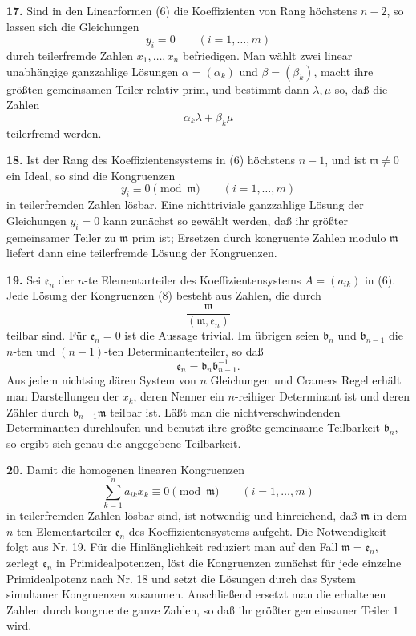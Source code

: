 \documentclass[11pt,a4paper]{article}
\begin{document}
\textbf{17.} Sind in den Linearformen (6) die Koeffizienten von Rang höchstens \(n-2\), so lassen sich die Gleichungen
\[
 y_i=0\qquad(i=1,\ldots,m)
\]
durch teilerfremde Zahlen \(x_1,\ldots,x_n\) befriedigen. Man wählt zwei linear unabhängige ganzzahlige Lösungen \(\alpha=(\alpha_k)\) und \(\beta=(\beta_k)\), macht ihre größten gemeinsamen Teiler relativ prim, und bestimmt dann \(\lambda,\mu\) so, daß die Zahlen
\[
 \alpha_k\lambda+\beta_k\mu
\]
teilerfremd werden.

\textbf{18.} Ist der Rang des Koeffizientensystems in (6) höchstens \(n-1\), und ist \(\mathfrak m\ne0\) ein Ideal, so sind die Kongruenzen
\[
 y_i\equiv0\pmod{\mathfrak m}\qquad(i=1,\ldots,m) \tag{8}
\]
in teilerfremden Zahlen lösbar. Eine nichttriviale ganzzahlige Lösung der Gleichungen \(y_i=0\) kann zunächst so gewählt werden, daß ihr größter gemeinsamer Teiler zu \(\mathfrak m\) prim ist; Ersetzen durch kongruente Zahlen modulo \(\mathfrak m\) liefert dann eine teilerfremde Lösung der Kongruenzen.

\textbf{19.} Sei \(\mathfrak e_n\) der \(n\)-te Elementarteiler des Koeffizientensystems \(A=(a_{ik})\) in (6). Jede Lösung der Kongruenzen (8) besteht aus Zahlen, die durch
\[
 \frac{\mathfrak m}{(\mathfrak m,\mathfrak e_n)}
\]
teilbar sind. Für \(\mathfrak e_n=0\) ist die Aussage trivial. Im übrigen seien \(\mathfrak b_n\) und \(\mathfrak b_{n-1}\) die \(n\)-ten und \((n-1)\)-ten Determinantenteiler, so daß
\[
 \mathfrak e_n=\mathfrak b_n\mathfrak b_{n-1}^{-1}.
\]
Aus jedem nichtsingulären System von \(n\) Gleichungen und Cramers Regel erhält man Darstellungen der \(x_k\), deren Nenner ein \(n\)-reihiger Determinant ist und deren Zähler durch \(\mathfrak b_{n-1}\mathfrak m\) teilbar ist. Läßt man die nichtverschwindenden Determinanten durchlaufen und benutzt ihre größte gemeinsame Teilbarkeit \(\mathfrak b_n\), so ergibt sich genau die angegebene Teilbarkeit.

\textbf{20.} Damit die homogenen linearen Kongruenzen
\[
 \sum_{k=1}^{n}a_{ik}x_k\equiv0\pmod{\mathfrak m}\qquad(i=1,\ldots,m) \tag{9}
\]
in teilerfremden Zahlen lösbar sind, ist notwendig und hinreichend, daß \(\mathfrak m\) in dem \(n\)-ten Elementarteiler \(\mathfrak e_n\) des Koeffizientensystems aufgeht. Die Notwendigkeit folgt aus Nr. 19. Für die Hinlänglichkeit reduziert man auf den Fall \(\mathfrak m=\mathfrak e_n\), zerlegt \(\mathfrak e_n\) in Primidealpotenzen, löst die Kongruenzen zunächst für jede einzelne Primidealpotenz nach Nr. 18 und setzt die Lösungen durch das System simultaner Kongruenzen zusammen. Anschließend ersetzt man die erhaltenen Zahlen durch kongruente ganze Zahlen, so daß ihr größter gemeinsamer Teiler \(1\) wird.
\end{document}

